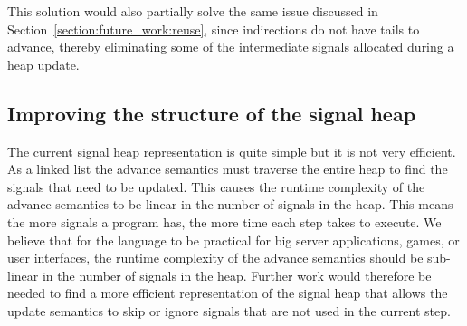This solution would also partially solve the same issue discussed in Section~\ref{section:future_work:reuse}, since indirections do not have tails to advance, thereby eliminating some of the intermediate signals allocated during a heap update.


\subsection{Improving the structure of the signal heap}

The current signal heap representation is quite simple but it is not very efficient. As a linked list the advance semantics must traverse the entire heap to find the signals that need to be updated. This causes the runtime complexity of the advance semantics to be linear in the number of signals in the heap.
This means the more signals a program has, the more time each step takes to execute. 
We believe that for the language to be practical for big server applications, games, or user interfaces, the runtime complexity of the advance semantics should be sub-linear in the number of signals in the heap. Further work would therefore be needed to find a more efficient representation of the signal heap that allows the update semantics to skip or ignore signals that are not used in the current step.
